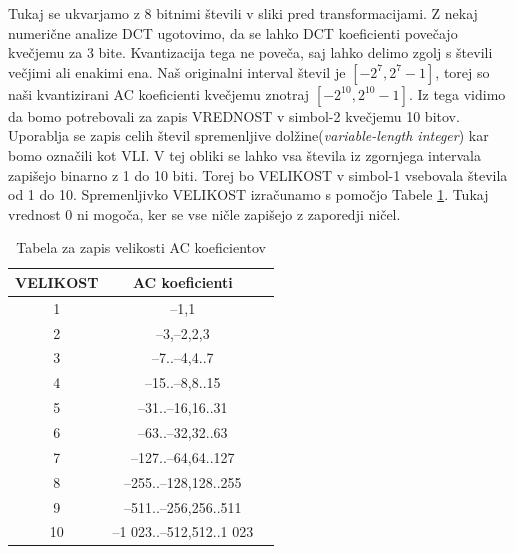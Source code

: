 \documentclass[a4paper,12pt,openright]{book}
\begin{document}
Tukaj se ukvarjamo z 8 bitnimi števili v sliki pred transformacijami. Z nekaj numerične analize DCT ugotovimo, da se lahko DCT koeficienti povečajo kvečjemu za 3 bite. Kvantizacija tega ne poveča, saj lahko delimo zgolj s števili večjimi ali enakimi ena. Naš originalni interval števil je \(\left[-2^7,2^7-1\right]\), torej so naši kvantizirani AC koeficienti kvečjemu znotraj \(\left[-2^{10},2^{10}-1\right]\). Iz tega vidimo da bomo potrebovali za zapis VREDNOST v simbol-2 kvečjemu 10 bitov. Uporablja se zapis celih števil spremenljive dolžine(\textit{variable-length integer}) kar bomo označili kot VLI. V tej obliki se lahko vsa števila iz zgornjega intervala zapišejo binarno z 1 do 10 biti. Torej bo VELIKOST v simbol-1 vsebovala števila od 1 do 10. Spremenljivko VELIKOST izračunamo s pomočjo Tabele \ref{tab:Velikost_AC}. Tukaj vrednost 0 ni mogoča, ker se vse ničle zapišejo z zaporedji ničel.\par

\begin{table}[ht]
\centering
\begin{tabular}{|c|c|c|}
\hline
VELIKOST& AC koeficienti\\
\hline
 1& –1,1\\
 2& –3,–2,2,3\\
 3& –7..–4,4..7\\
 4& –15..–8,8..15\\
 5& –31..–16,16..31\\
 6& –63..–32,32..63\\
 7& –127..–64,64..127\\
 8& –255..–128,128..255\\
 9& –511..–256,256..511\\
10& –1 023..–512,512..1 023\\
\hline
\end{tabular}
\caption{Tabela za zapis velikosti AC koeficientov}
\label{tab:Velikost_AC}
\end{table}
\end{document}
